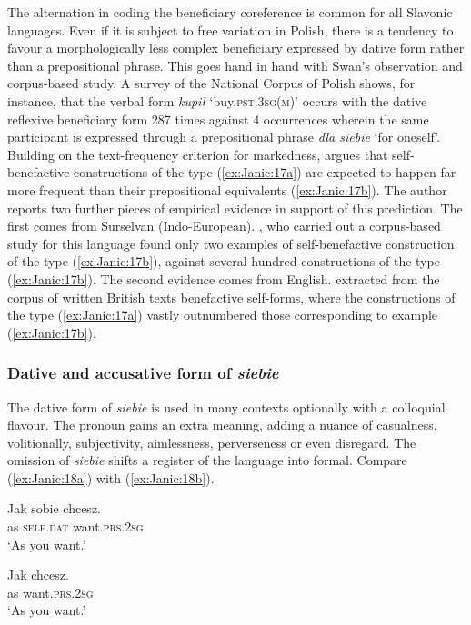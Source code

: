 \documentclass[output=paper]{langscibook}
\begin{document}
	 
The alternation in coding the beneficiary coreference is common for all Slavonic languages. Even if it is subject to free variation in Polish, there is a tendency to favour a morphologically less complex beneficiary expressed by dative form rather than a prepositional phrase. This goes hand in hand with Swan's \citeyear{Swan2002} observation and corpus-based study. A survey of the National Corpus of Polish shows, for instance, that the verbal form \textit{kupił} ‘buy.\textsc{pst.3sg(m)}’ occurs with the dative reflexive beneficiary form 287 times against 4 occurrences wherein the same participant is expressed through a prepositional phrase \textit{dla siebie} ‘for oneself’. Building on the text-frequency criterion for markedness, \citet{Kemmer1993}  argues that self-benefactive constructions of the type (\ref{ex:Janic:17a}) are expected to happen far more frequent than their prepositional equivalents (\ref{ex:Janic:17b}). The author reports two further pieces of empirical evidence in support of this prediction. The first comes from Surselvan (Indo-European). \citet[50]{Stimm1973}, who carried out a corpus-based study for this language found only two examples of self-benefactive construction of the type (\ref{ex:Janic:17b}), against several hundred constructions of the type (\ref{ex:Janic:17b}). The second evidence comes from English. \citet{Kemmer1993}  extracted from the corpus of written British texts benefactive self-forms, where the constructions of the type (\ref{ex:Janic:17a}) vastly outnumbered those corresponding to example (\ref{ex:Janic:17b}).


\subsubsection{Dative and accusative form of \textit{siebie}} \label{sec:Janic:3.1.4}

The dative form of \textit{siebie} is used in many contexts optionally with a colloquial flavour. The pronoun gains an extra meaning, adding a nuance of casualness, volitionally, subjectivity, aimlessness, perverseness or even disregard. The omission of \textit{siebie} shifts a register of the language into formal. Compare (\ref{ex:Janic:18a}) with (\ref{ex:Janic:18b}).

\ea \label{ex:Janic:18}
\ea \label{ex:Janic:18a}
\gll Jak	sobie	 chcesz.\\
	 as	\textsc{self.dat}	want.\textsc{prs.2sg}\\
\glt	‘As you want.’

\ex \label{ex:Janic:18b}
\gll Jak	chcesz.\\
 	as	want.\textsc{prs.2sg}\\
\glt ‘As you want.’	
\z 
\z 
\end{document}
